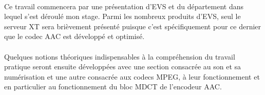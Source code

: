 \documentclass{article}
\begin{document}
    \paragraph{}

    \paragraph{}


    \paragraph{}
    Ce travail commencera par une présentation d'EVS et du département dans lequel s'est déroulé mon stage. Parmi les nombreux produits d'EVS, seul le serveur XT sera brièvement présenté puisque c'est spécifiquement pour ce dernier que le codec AAC est développé et optimisé.

    \paragraph{}
    Quelques notions théoriques indispensables à la compréhension du travail pratique seront ensuite développées avec une section consacrée au son et sa numérisation et une autre consacrée aux codecs MPEG, à leur fonctionnement et en particulier au fonctionnement du bloc MDCT de l'encodeur AAC.



\end{document}
